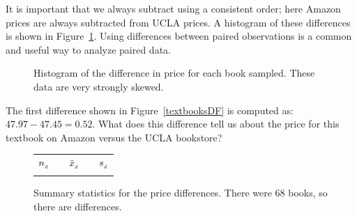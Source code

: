 It is important that we always subtract using
a consistent order;
here Amazon prices are always subtracted from UCLA prices.
A histogram of these differences is shown in
Figure~\ref{diffInTextbookPricesF18}.
Using differences between paired observations
is a common and useful way to analyze paired data.

\begin{figure}
\centering
\caption{Histogram of the difference in price for
    each book sampled.
    These data are very strongly skewed.}
\label{diffInTextbookPricesF18}
\end{figure}

\begin{exercisewrap}
\begin{nexercise}
The first difference shown in Figure~\ref{textbooksDF}
is computed as: $47.97 - 47.45 = 0.52$.
What does this difference tell us about the price for this textbook on Amazon versus the UCLA bookstore?\footnotemark
\end{nexercise}
\end{exercisewrap}


\begin{figure}[hh]
\centering
\begin{tabular}{ccccc}
\hline
$n_{_{\text{\emph{d}}}}$	&\hspace{3mm}& $\bar{x}_{_{\text{\emph{d}}}}$	&\hspace{3mm}& $s_{_{\text{\emph{d}}}}$ \vspace{1mm}\\
\uclabookN{}  && \uclabookM{}  && \uclabookSD{} \\
\hline
\end{tabular}
\caption{Summary statistics for the price differences.
    There were 68 books, so there are \uclabookN{}
    differences.}
\label{textbooksSummaryStats}
\end{figure}


